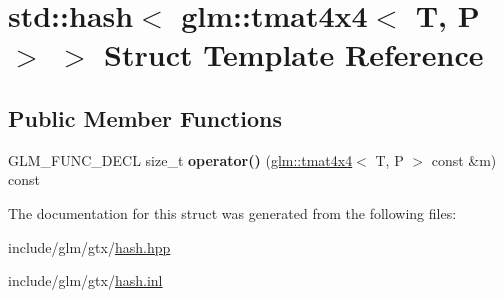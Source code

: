 \hypertarget{structstd_1_1hash_3_01glm_1_1tmat4x4_3_01T_00_01P_01_4_01_4}{}\section{std\+:\+:hash$<$ glm\+:\+:tmat4x4$<$ T, P $>$ $>$ Struct Template Reference}
\label{structstd_1_1hash_3_01glm_1_1tmat4x4_3_01T_00_01P_01_4_01_4}
\subsection*{Public Member Functions}
\begin{DoxyCompactItemize}
\item 
\mbox{\label{structstd_1_1hash_3_01glm_1_1tmat4x4_3_01T_00_01P_01_4_01_4_a3bd23d68315c4cb50e80fe41e3aa8b1c}} 
G\+L\+M\+\_\+\+F\+U\+N\+C\+\_\+\+D\+E\+CL size\+\_\+t {\bfseries operator()} (\hyperlink{structglm_1_1tmat4x4}{glm\+::tmat4x4}$<$ T, P $>$ const \&m) const
\end{DoxyCompactItemize}


The documentation for this struct was generated from the following files\+:\begin{DoxyCompactItemize}
\item 
include/glm/gtx/\hyperlink{hash_8hpp}{hash.\+hpp}\item 
include/glm/gtx/\hyperlink{hash_8inl}{hash.\+inl}\end{DoxyCompactItemize}
